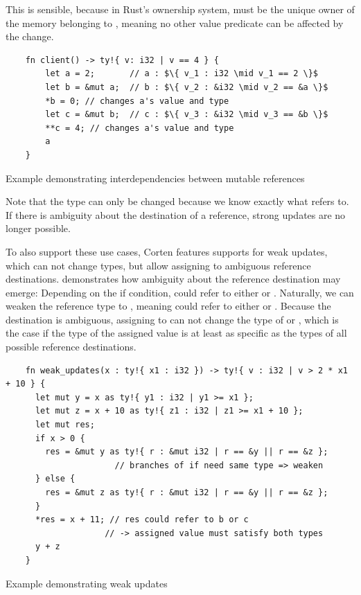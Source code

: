 \documentclass[twoside, english, final]{sdqthesis}
\theoremstyle{definition}
\begin{document}
This is sensible, because in Rust's ownership system,  must be the unique owner of the memory belonging to , meaning no other value predicate can be affected by the change.

\begin{listing}[h]
  \begin{verbatim}
    fn client() -> ty!{ v: i32 | v == 4 } {
        let a = 2;       // a : $\{ v_1 : i32 \mid v_1 == 2 \}$
        let b = &mut a;  // b : $\{ v_2 : &i32 \mid v_2 == &a \}$
        *b = 0; // changes a's value and type
        let c = &mut b;  // c : $\{ v_3 : &i32 \mid v_3 == &b \}$
        **c = 4; // changes a's value and type
        a
    }
  \end{verbatim}
  \caption{Example demonstrating interdependencies between mutable references}
  \label{lst:mutation-strong}
\end{listing}

Note that the type can only be changed because we know exactly what  refers to. If there is ambiguity about the destination of a reference, strong updates are no longer possible.

To also support these use cases, Corten features supports for weak updates, which can not change types, but allow assigning to ambiguous reference destinations.
 demonstrates how ambiguity about the reference destination may emerge: Depending on the if condition,  could refer to either  or .
Naturally, we can weaken the reference type to , meaning  could refer to either  or .
Because the destination is ambiguous, assigning to  can not change the type of  or , which is the case if the type of the assigned value is at least as specific as the types of all possible reference destinations.

\begin{listing}[h]
  \begin{verbatim}
    fn weak_updates(x : ty!{ x1 : i32 }) -> ty!{ v : i32 | v > 2 * x1 + 10 } {
      let mut y = x as ty!{ y1 : i32 | y1 >= x1 };
      let mut z = x + 10 as ty!{ z1 : i32 | z1 >= x1 + 10 };
      let mut res;
      if x > 0 {
        res = &mut y as ty!{ r : &mut i32 | r == &y || r == &z };
                      // branches of if need same type => weaken
      } else {
        res = &mut z as ty!{ r : &mut i32 | r == &y || r == &z };
      }
      *res = x + 11; // res could refer to b or c 
                    // -> assigned value must satisfy both types
      y + z
    }
  \end{verbatim}
  \caption{Example demonstrating weak updates}
  \label{lst:mutation-weak}
\end{listing}
\end{document}
